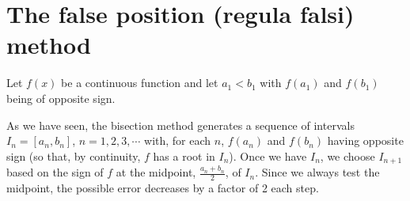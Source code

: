 \section{The false position (regula falsi) method}\label{sec_C_3}

Let $f(x)$ be a continuous function and let $a_1<b_1$ with $f(a_1)$ and $f(b_1)$ being of opposite sign.

As we have seen, the bisection method generates a sequence of intervals $I_n=[a_n,b_n]$, $n=1,2,3,\cdots$ with, for each $n$, $f(a_n)$ and $f(b_n)$ 
having opposite sign (so that, by continuity, $f$ has a root in $I_n$). 
Once we have $I_n$, we choose $I_{n+1}$ based on the sign of $f$ at 
the midpoint, $\frac{a_n+b_n}{2}$, of $I_n$. Since we always test the midpoint, the possible error decreases by a factor of 2 each step.

